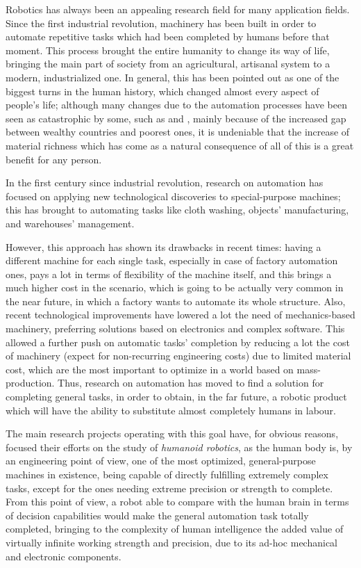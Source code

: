 Robotics has always been an appealing research field for many
application fields. Since the first industrial revolution, machinery
has been built in order to automate repetitive tasks which had been
completed by humans before that moment. This process brought the
entire humanity to change its way of life, bringing the main part of
society from an agricultural, artisanal system to a modern,
industrialized one. In general, this has been pointed out as one of
the biggest turns in the human history, which changed almost every
aspect of people's life; although many changes due to the automation
processes have been seen as catastrophic by some, such as
\cite{bombarolo} and \cite{extinction}, mainly because of the
increased gap between wealthy countries and poorest ones, it is
undeniable that the increase of material richness which has come as a natural
consequence of all of this is a great benefit for any person.

In the first century since industrial revolution, research on
automation has focused on applying new technological discoveries to
special-purpose machines; this has brought to automating tasks like
cloth washing, objects' manufacturing, and warehouses' management.

However, this approach has shown its drawbacks in recent times: having
a different machine for each single task, especially in case of
factory automation ones, pays a lot in terms of flexibility of the
machine itself, and this brings a much higher cost in the scenario,
which is going to be actually very common in the near future, in which
a factory wants to automate its whole structure. Also, recent
technological improvements have lowered a lot the need of
mechanics-based machinery, preferring solutions based on electronics
and complex software. This allowed a further push on automatic tasks'
completion by reducing a lot the cost of machinery (expect for
non-recurring engineering costs) due to limited material cost, which
are the most important to optimize in a world based on
mass-production. Thus, research on automation has moved to find a
solution for completing general tasks, in order to obtain, in the far
future, a robotic product which will have the ability to substitute
almost completely humans in labour.

The main research projects operating with this goal have, for obvious
reasons, focused their efforts on the study of \emph{humanoid
  robotics}, as the human body is, by an engineering point of view,
one of the most optimized, general-purpose machines in existence,
being capable of directly fulfilling extremely complex tasks, except for the
ones needing extreme precision or strength to complete. From this point of view, a
robot able to compare with the human brain in terms of decision capabilities
would make the general automation task totally completed, bringing to
the complexity of human intelligence the added value of virtually
infinite working strength and precision, due to its ad-hoc mechanical
and electronic components.

